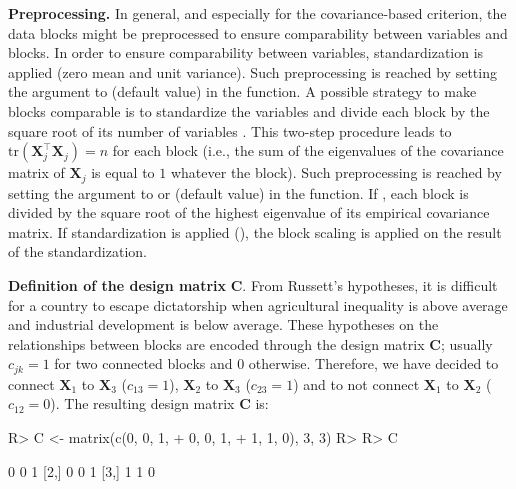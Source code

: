 \documentclass[
]{jss}
\begin{document}
\normalsize

\textbf{Preprocessing.} In general, and especially for the
covariance-based criterion, the data blocks might be preprocessed to
ensure comparability between variables and blocks. In order to ensure
comparability between variables, standardization is applied (zero mean
and unit variance). Such preprocessing is reached by setting the
 argument to  (default value) in the
 function. A possible strategy to make blocks comparable
is to standardize the variables and divide each block by the square root
of its number of variables \citep{Westerhuis1998}. This two-step
procedure leads to \(\mathrm{tr}(\mathbf X_j^\top \mathbf X_j )=n\) for
each block (i.e., the sum of the eigenvalues of the covariance matrix of
\(\mathbf X_j\) is equal to \(1\) whatever the block). Such
preprocessing is reached by setting the  argument to
 or  (default value) in the 
function. If , each block is divided by
the square root of the highest eigenvalue of its empirical covariance
matrix. If standardization is applied (), the block
scaling is applied on the result of the standardization.

\textbf{Definition of the design matrix} \(\mathbf{C}\). From Russett's
hypotheses, it is difficult for a country to escape dictatorship when
agricultural inequality is above average and industrial development is
below average. These hypotheses on the relationships between blocks are
encoded through the design matrix \(\mathbf{C}\); usually \(c_{jk} = 1\)
for two connected blocks and \(0\) otherwise. Therefore, we have decided
to connect \(\mathbf X_1\) to \(\mathbf X_3\) (\(c_{13} = 1\)),
\(\mathbf X_2\) to \(\mathbf X_3\) (\(c_{23} = 1\)) and to not connect
\(\mathbf X_1\) to \(\mathbf X_2\) (\(c_{12} = 0\)). The resulting
design matrix \(\mathbf{C}\) is:

\footnotesize

\begin{CodeChunk}
\begin{CodeInput}
R> C <- matrix(c(0, 0, 1,
+               0, 0, 1,
+               1, 1, 0), 3, 3)
R> 
R> C
\end{CodeInput}
\begin{CodeOutput}
     [,1] [,2] [,3]
[1,]    0    0    1
[2,]    0    0    1
[3,]    1    1    0
\end{CodeOutput}
\end{CodeChunk}
\end{document}
